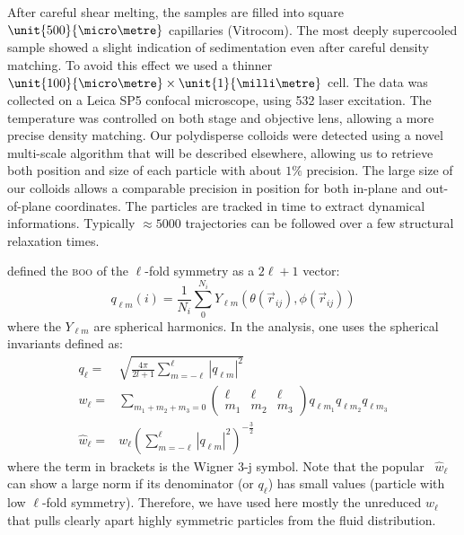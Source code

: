 After careful shear melting, the samples are filled into square $\unit{500}{\micro\metre}$ capillaries (Vitrocom). The most deeply supercooled sample showed a slight indication of sedimentation even after careful density matching. To avoid this effect we used a thinner $\unit{100}{\micro\metre}\times\unit{1}{\milli\metre}$ cell. The data was collected on a Leica SP5 confocal microscope, using \unit{532}{\nano\meter} laser excitation. The temperature was controlled on both stage and objective lens, allowing a more precise density matching. Our polydisperse colloids were detected using a novel multi-scale algorithm that will be described elsewhere, allowing us to retrieve both position and size of each particle with about $1\%$ precision. The large size of our colloids allows a comparable precision in position for both in-plane and out-of-plane coordinates. The particles are tracked in time to extract dynamical informations. Typically $\approx 5000$ trajectories can be followed over a few structural relaxation times.



\citet{steinhardt1983boo} defined the \textsc{boo} of the $\ell$-fold symmetry as a $2\ell+1$ vector:
\begin{equation}
	q_{\ell m}(i) = \frac{1}{N_i}\sum_{0}^{N_i} Y_{\ell m}(\theta(\vec r_{ij}),\phi(\vec r_{ij}))
	\label{eq:qlm}
\end{equation}
where the $Y_{\ell m}$ are spherical harmonics. In the analysis, one uses the spherical invariants defined as:
\begin{align}
	q_\ell =& \sqrt{\frac{4\pi}{2l+1} \sum_{m=-\ell}^{\ell} |q_{\ell m}|^2 }\label{eq:ql}\\
	w_\ell =& \sum_{m_1+m_2+m_3=0} 
			\left( \begin{array}{ccc}
				\ell & \ell & \ell \\
				m_1 & m_2 & m_3 
			\end{array} \right)
			q_{\ell m_1} q_{\ell m_2} q_{\ell m_3} \label{eq:wl}\\
	\hat{w}_\ell =& w_\ell{\left( \sum_{m=-\ell}^{\ell} |q_{\ell m}|^2 \right)}^{-\frac{3}{2}}
\end{align}
where the term in brackets is the Wigner 3-j symbol. Note that the popular~\citep{steinhardt1983boo,Lechner2008} $\hat{w}_\ell$ can show a large norm if its denominator (or $q_\ell$) has small values (particle with low $\ell$-fold symmetry). Therefore, we have used here mostly the unreduced $w_\ell$ that pulls clearly apart highly symmetric particles from the fluid distribution.

